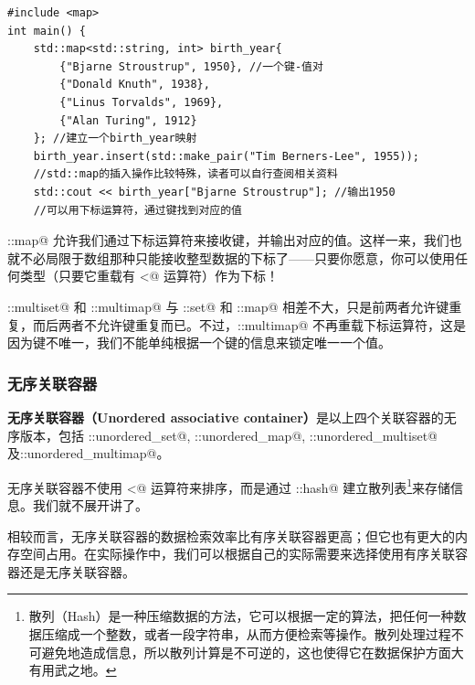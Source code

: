 \begin{lstlisting}
#include <map>
int main() {
    std::map<std::string, int> birth_year{
        {"Bjarne Stroustrup", 1950}, //一个键-值对
        {"Donald Knuth", 1938},
        {"Linus Torvalds", 1969},
        {"Alan Turing", 1912}
    }; //建立一个birth_year映射
    birth_year.insert(std::make_pair("Tim Berners-Lee", 1955));
    //std::map的插入操作比较特殊，读者可以自行查阅相关资料
    std::cout << birth_year["Bjarne Stroustrup"]; //输出1950
    //可以用下标运算符，通过键找到对应的值
\end{lstlisting}
\lstinline@std::map@ 允许我们通过下标运算符来接收键，并输出对应的值。这样一来，我们也就不必局限于数组那种只能接收整型数据的下标了——只要你愿意，你可以使用任何类型（只要它重载有 \lstinline@<@ 运算符）作为下标！\par
\lstinline@std::multiset@ 和 \lstinline@std::multimap@ 与 \lstinline@std::set@ 和 \lstinline@std::map@ 相差不大，只是前两者允许键重复，而后两者不允许键重复而已。不过，\lstinline@std::multimap@ 不再重载下标运算符，这是因为键不唯一，我们不能单纯根据一个键的信息来锁定唯一一个值。\par
\subsubsection*{无序关联容器}
\textbf{无序关联容器（Unordered associative container）}是以上四个关联容器的无序版本，包括 \lstinline@std::unordered_set@, \lstinline@std::unordered_map@, \lstinline@std::unordered_multiset@ 及\newline\lstinline@std::unordered_multimap@。\par
无序关联容器不使用 \lstinline@<@ 运算符来排序，而是通过 \lstinline@std::hash@ 建立散列表\footnote{散列（Hash）是一种压缩数据的方法，它可以根据一定的算法，把任何一种数据压缩成一个整数，或者一段字符串，从而方便检索等操作。散列处理过程不可避免地造成信息，所以散列计算是不可逆的，这也使得它在数据保护方面大有用武之地。}来存储信息。我们就不展开讲了。\par
相较而言，无序关联容器的数据检索效率比有序关联容器更高；但它也有更大的内存空间占用。在实际操作中，我们可以根据自己的实际需要来选择使用有序关联容器还是无序关联容器。\par
